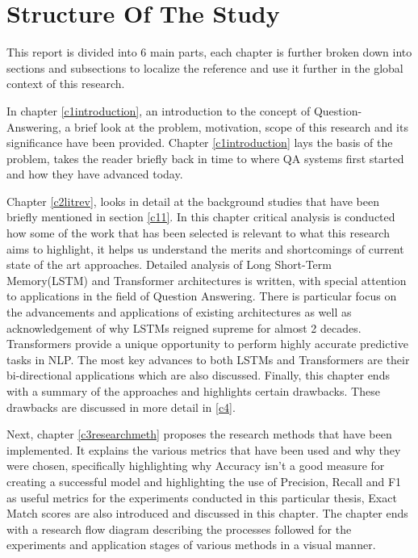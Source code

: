 \documentclass[a4paper,12pt]{report}
\begin{document}
        \section{Structure Of The Study}\label{15}
        
        This report is divided into 6 main parts, each chapter is further broken down into sections and subsections to localize the reference and use it further in the global context of this research.
        
        In chapter \ref{c1introduction}, an introduction to the concept of Question-Answering, a brief look at the problem, motivation, scope of this research and its significance have been provided. Chapter \ref{c1introduction} lays the basis of the problem, takes the reader briefly back in time to where QA systems first started and how they have advanced today. 
        
        Chapter \ref{c2litrev}, looks in detail at the background studies that have been briefly mentioned in section \ref{c11}. In this chapter critical analysis is conducted how some of the work that has been selected is relevant to what this research aims to highlight, it helps us understand the merits and shortcomings of current state of the art approaches. Detailed analysis of Long Short-Term Memory(LSTM) and Transformer architectures is written, with special attention to applications in the field of Question Answering. There is particular focus on the advancements and applications of existing architectures as well as acknowledgement of why LSTMs reigned supreme for almost 2 decades. Transformers provide a unique opportunity to perform highly accurate predictive tasks in NLP. The most key advances to both LSTMs and Transformers are their bi-directional applications which are also discussed. Finally, this chapter ends with a summary of the approaches and highlights certain drawbacks. These drawbacks are discussed in more detail in \ref{c4}.
        
        Next, chapter \ref{c3researchmeth} proposes the research methods that have been implemented. It explains the various metrics that have been used and why they were chosen, specifically highlighting why Accuracy isn't a good measure for creating a successful model and highlighting the use of Precision, Recall and F1 as useful metrics for the experiments conducted in this particular thesis, Exact Match scores are also introduced and discussed in this chapter. The chapter ends with a research flow diagram describing the processes followed for the experiments and application stages of various methods in a visual manner.
        
\end{document}
